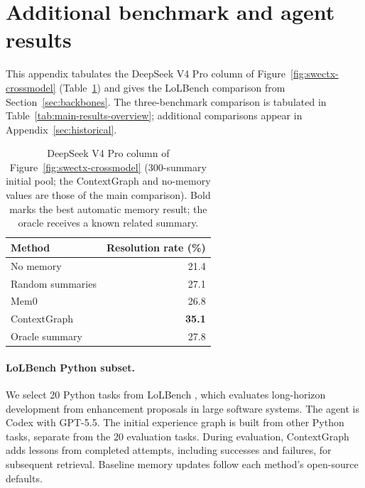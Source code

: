 \section{Additional benchmark and agent results}
\label{sec:new-results}
This appendix tabulates the DeepSeek V4 Pro column of
Figure~\ref{fig:swectx-crossmodel} (Table~\ref{tab:new-swectx}) and gives the
LoLBench comparison from
Section~\ref{sec:backbones}.
The three-benchmark comparison is tabulated in
Table~\ref{tab:main-results-overview}; additional comparisons appear in
Appendix~\ref{sec:historical}.

\begin{table}[htbp]
\centering
\caption{DeepSeek V4 Pro column of Figure~\ref{fig:swectx-crossmodel}
(300-summary initial pool; the ContextGraph and no-memory values are those of
the main comparison). Bold marks the best automatic memory result; the oracle
receives a known related summary.}
\label{tab:new-swectx}
\begin{tabular}{lr}
\toprule
Method & Resolution rate (\%) \\
\midrule
No memory & 21.4 \\
Random summaries & 27.1 \\
Mem0 & 26.8 \\
ContextGraph & \textbf{35.1} \\
\midrule
Oracle summary & 27.8 \\
\bottomrule
\end{tabular}
\end{table}

\paragraph{LoLBench Python subset.}
We select 20 Python tasks from LoLBench \citep{lolbench2026}, which evaluates
long-horizon development from enhancement proposals in large software
systems. The agent is Codex with GPT-5.5. The initial experience graph is
built from other Python tasks, separate from the 20 evaluation tasks.
During evaluation, ContextGraph adds lessons from completed attempts,
including successes and failures, for subsequent retrieval. Baseline
memory updates follow each method's open-source defaults.

